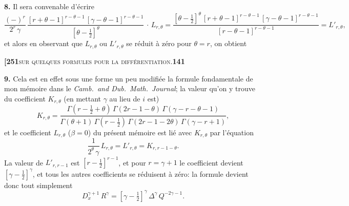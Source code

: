 \documentclass[11pt]{article}
\begin{document}
\textbf{8.} Il sera convenable d'écrire
\[
\frac{(-)^r}{2^r\,\gamma}\,\frac{[r + \theta - 1]^{r-\theta-1}\,[\gamma - \theta - 1]^{r-\theta-1}}{[\theta - \tfrac{1}{2}]^{\theta}}\,\cdot\,L_{r,\theta} = \frac{[\theta - \tfrac{1}{2}]^{\theta}\,[r + \theta - 1]^{r-\theta-1}\,[\gamma - \theta - 1]^{r-\theta-1}}{[r - \theta - 1]^{r-\theta-1}} = L'_{r,\theta},
\]
et alors en observant que $L_{r,\theta}$ ou $L'_{r,\theta}$ se réduit à zéro pour $\theta = r$, on obtient

\newpage

\noindent\textbf{[251}\hfill\textsc{sur quelques formules pour la différentiation.}\hfill\textbf{141}

\medskip

\textbf{9.} Cela est en effet sous une forme un peu modifiée la formule fondamentale de mon mémoire dans le \textit{Camb.~and Dub.~Math.~Journal}; la valeur qu'on y trouve du coefficient $K_{r,\theta}$ (en mettant $\gamma$ au lieu de $i$ est)
\[
K_{r,\theta} = \frac{\Gamma(r-\tfrac{1}{2}+\theta)\,\Gamma(2r-1-\theta)\,\Gamma(\gamma-r-\theta-1)}{\Gamma(\theta+1)\,\Gamma(r-\tfrac{1}{2})\,\Gamma(2r-1-2\theta)\,\Gamma(\gamma-r+1)},
\]
et le coefficient $L_{r,\theta}$ ($\beta = 0$) du présent mémoire est lié avec $K_{r,\theta}$ par l'équation
\[
\frac{1}{2^{\theta}\,\gamma}\,L_{r,\theta} = L'_{r,\theta} = K_{r,r-1-\theta}.
\]
La valeur de $L'_{r,r-1}$ est $[r - \tfrac{1}{2}]^{r-1}$, et pour $r = \gamma + 1$ le coefficient devient $[\gamma - \tfrac{1}{2}]^{\gamma}$, et tous les autres coefficients se réduisent à zéro: la formule devient donc tout simplement
\[
D_x^{\gamma+1}\,R^{\gamma} = [\gamma - \tfrac{1}{2}]^{\gamma}\,\Delta^{\gamma}\,Q^{-2\gamma-1}.
\]

\medskip
\end{document}
